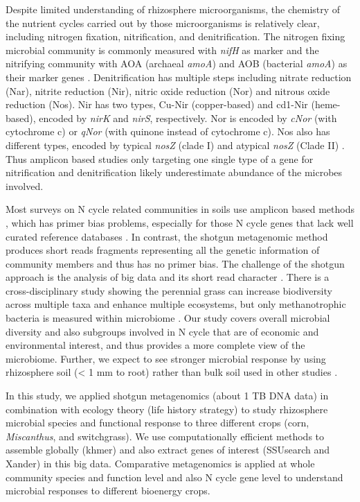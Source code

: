 \documentclass[]{msu-thesis}
\begin{document}
Despite limited understanding of rhizosphere microorganisms, the chemistry of
the nutrient cycles carried out by those microorganisms is relatively clear,
including nitrogen fixation, nitrification, and denitrification. The nitrogen
fixing microbial community is commonly measured with \textit{nifH} as marker
and the nitrifying community with AOA (archaeal \textit{amoA}) and AOB
(bacterial \textit{amoA}) as their marker genes
\cite{gaby_comprehensive_2012,prosser_archaeal_2012}.  Denitrification has
multiple steps including nitrate reduction (Nar), nitrite reduction (Nir),
nitric oxide reduction (Nor) and nitrous oxide reduction (Nos).  Nir has two
types, Cu-Nir (copper-based) and cd1-Nir (heme-based), encoded by \textit{nirK}
and \textit{nirS}, respectively. Nor is encoded by \textit{cNor} (with
cytochrome c) or \textit{qNor} (with quinone instead of cytochrome c). Nos also
has different types, encoded by typical \textit{nosZ} (clade I) and atypical
\textit{nosZ} (Clade II)
\cite{zumft_cell_1997,hendriks_nitric_2000,sanford_unexpected_2012,yoon_nitrous_2016}.
Thus amplicon based studies only targeting one single type of a gene for
nitrification and denitrification likely underestimate abundance of the
microbes involved.

Most surveys on N cycle related communities in soils use amplicon based
methods
\cite{gaby_comprehensive_2012,sanford_unexpected_2012,heylen_incidence_2006},
which has primer bias problems, especially for those N cycle genes that
lack well curated reference databases
\cite{gaby_comprehensive_2012,sanford_unexpected_2012,heylen_incidence_2006}.
In contrast, the shotgun metagenomic method produces short reads
fragments representing all the genetic information of community members
and thus has no primer bias. The challenge of the shotgun approach is
the analysis of big data and its short read character
\cite{qin_human_2010,pell_scaling_2012}. There is a cross-disciplinary
study showing the perennial grass can increase biodiversity across
multiple taxa and enhance multiple ecosystems, but only methanotrophic
bacteria is measured within microbiome \cite{werling_perennial_2014}.
Our study covers overall microbial diversity and also subgroups involved
in N cycle that are of economic and environmental interest, and thus
provides a more complete view of the microbiome. Further, we expect to
see stronger microbial response by using rhizosphere soil (< 1 mm to
root) rather than bulk soil used in other studies
\cite{mao_impact_2013,werling_perennial_2014}.

In this study, we applied shotgun metagenomics (about 1 TB DNA data) in
combination with ecology theory (life history strategy) to study
rhizosphere microbial species and functional response to three different
crops (corn, \textit{Miscanthus}, and switchgrass). We use computationally
efficient methods to assemble globally (khmer)
\cite{pell_scaling_2012,zhang_these_2014,crusoe_khmer_2015} and also
extract genes of interest (SSUsearch and Xander)
\cite{guo_microbial_2015,wang_xander:_2015} in this big data.
Comparative metagenomics is applied at whole community species and
function level and also N cycle gene level to understand microbial
responses to different bioenergy crops. 
\end{document}
